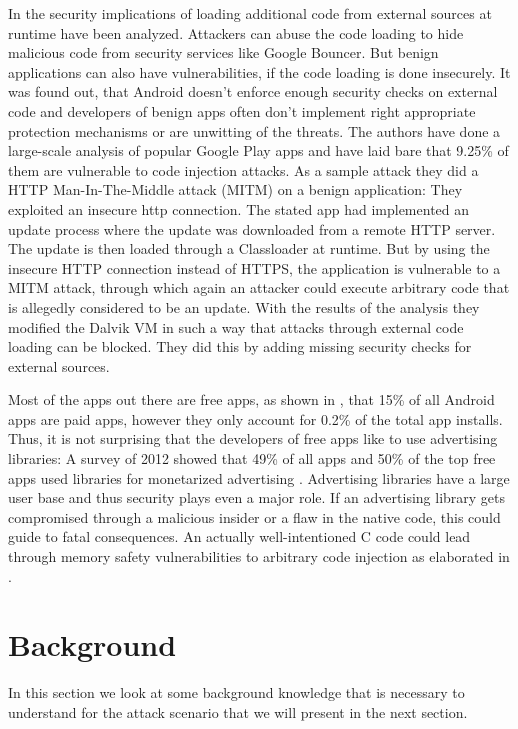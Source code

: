 In \cite{ExecuteThis} the security implications of loading additional code from external sources at runtime have been analyzed. Attackers can abuse the code loading to hide malicious code from security services like Google Bouncer. But benign applications can also have vulnerabilities, if the code loading is done insecurely. It was found out, that Android doesn't enforce enough security checks on external code and developers of benign apps often don't implement right appropriate protection mechanisms or are unwitting of the threats. The authors have done a large-scale analysis of popular Google Play apps and have laid bare that 9.25\% of them are vulnerable to code injection attacks. As a sample attack they did a HTTP Man-In-The-Middle attack (MITM) on a benign application:
They exploited an insecure http connection. The stated app had implemented an update process where the update was downloaded from a remote HTTP server. The update is then loaded through a Classloader at runtime. But by using the insecure HTTP connection instead of HTTPS, the application is vulnerable to a MITM attack, through which again an attacker could execute arbitrary code that is allegedly considered to be an update.
With the results of the analysis they modified the Dalvik VM in such a way that attacks through external code loading can be blocked. They did this by adding missing security checks for external sources.

Most of the apps out there are free apps, as shown in \cite[p. 164]{Wang:2017:ESM:3038912.3052712}, that 15\% of all Android apps are paid apps, however they only account for 0.2\% of the total app installs. 
Thus, it is not surprising that the developers of free apps like to use advertising libraries: A survey of 2012 showed that 49\% of all apps and 50\% of the top free apps used libraries for monetarized advertising \cite[p.7]{Pearce:2012:APS:2414456.2414498}. 
Advertising libraries have a large user base and thus security plays even a major role. 
If an advertising library gets compromised through a malicious insider or a flaw in the native code, this could guide to fatal consequences. 
An actually well-intentioned C code could lead through memory safety vulnerabilities to arbitrary code injection as elaborated in \cite{Szekeres:2013:SEW:2497621.2498101}.

\section{Background}

In this section we look at some background knowledge that is necessary to understand for the attack scenario that we will present in the next section.
 

